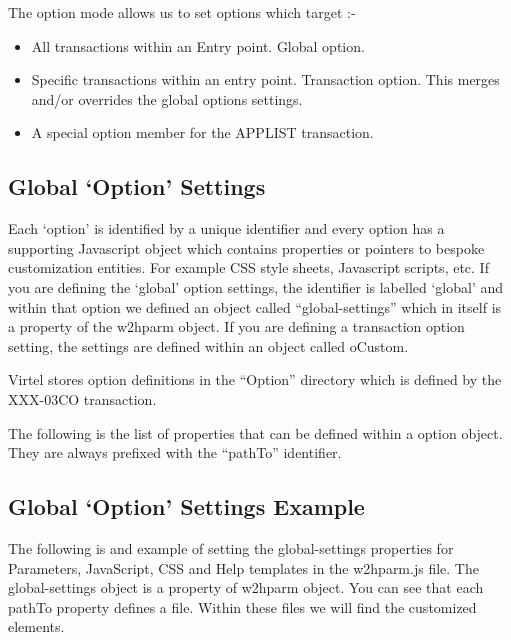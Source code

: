 \documentclass[letterpaper,10pt,english]{sphinxmanual}
\begin{document}
The option mode allows us to set options which target :-
\begin{itemize}
\item {} 
All transactions within an Entry point. Global option.

\item {} 
Specific transactions within an entry point. Transaction option. This merges and/or overrides the global options settings.

\item {} 
A special option member for the APPLIST transaction.

\end{itemize}


\subsection{Global ‘Option’ Settings}
\label{\detokenize{TN202002:global-option-settings}}
Each ‘option’ is identified by a unique identifier and every option has a supporting Javascript object which contains properties or pointers to bespoke customization entities. For example CSS style sheets, Javascript scripts, etc. If you are defining the ‘global’ option settings, the identifier is labelled ‘global’ and within that option we defined an object called “global-settings” which in itself is a property of the w2hparm object. If you are defining a transaction option setting, the settings are defined within an object called oCustom.

Virtel stores option definitions in the “Option” directory which is defined by the XXX-03CO transaction.

The following is the list of properties that can be defined within a option object. They are always prefixed with the “pathTo” identifier.


\subsection{Global ‘Option’ Settings Example}
\label{\detokenize{TN202002:global-option-settings-example}}
The following is and example of setting the global-settings properties for Parameters, JavaScript, CSS and Help templates in the w2hparm.js file. The global-settings object is a property of w2hparm object. You can see that each pathTo property defines a file. Within these files we will find the customized elements.
\end{document}
